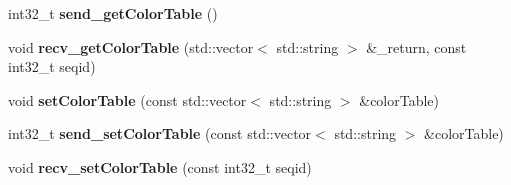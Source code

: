 \begin{DoxyCompactItemize}
\item 
\mbox{\label{classMARS_1_1MARSConcurrentClient_a3d8e8c14814bc75a56b0d44e4a64b630}} 
int32\+\_\+t {\bfseries send\+\_\+get\+Color\+Table} ()
\item 
\mbox{\label{classMARS_1_1MARSConcurrentClient_ac9b85a17f818f274c012526f55c6b63f}} 
void {\bfseries recv\+\_\+get\+Color\+Table} (std\+::vector$<$ std\+::string $>$ \&\+\_\+return, const int32\+\_\+t seqid)
\item 
\mbox{\label{classMARS_1_1MARSConcurrentClient_a30ab9c7af1f8004627f5b3dd7c3d708d}} 
void {\bfseries set\+Color\+Table} (const std\+::vector$<$ std\+::string $>$ \&color\+Table)
\item 
\mbox{\label{classMARS_1_1MARSConcurrentClient_a25e1d52136ba48a6ab36dcdb26f96992}} 
int32\+\_\+t {\bfseries send\+\_\+set\+Color\+Table} (const std\+::vector$<$ std\+::string $>$ \&color\+Table)
\item 
\mbox{\label{classMARS_1_1MARSConcurrentClient_aaf2eb6886251ebd58e09bbba02566c5a}} 
void {\bfseries recv\+\_\+set\+Color\+Table} (const int32\+\_\+t seqid)
\end{DoxyCompactItemize}
